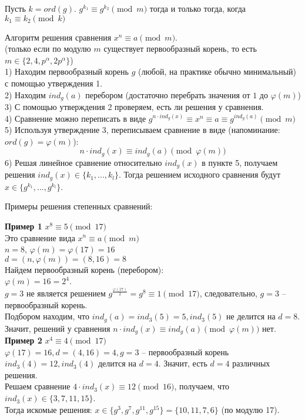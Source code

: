 \begin{proposition}[б/д]
    Пусть $k = ord(g)$. $g^{k_1} \equiv g^{k_2} \pmod{m}$ тогда и только тогда, когда $k_1 \equiv k_2 \pmod{k}$
\end{proposition}

\begin{example}
    Алгоритм решения сравнения $x^n \equiv a \pmod{m}$.\\
    (только если по модулю $m$ существует первообразный корень, то есть $m \in \{2, 4, p^{\alpha}, 2p^{\alpha}\}$)\\
    1) Находим первообразный корень $g$ (любой, на практике обычно минимальный) с помощью утверждения 1.\\
    2) Находим $ind_g(a)$ перебором (достаточно перебрать значения от $1$ до $\varphi(m)$)\\
    3) С помощью утверждения 2 проверяем, есть ли решения у сравнения.\\
    4) Сравнение можно переписать в виде $g^{n \cdot ind_g(x)} \equiv x^n \equiv a \equiv g^{ind_g(a)} \pmod{m}$\\
    5) Используя утверждение 3, переписываем сравнение в виде (напоминание: $ord(g) = \varphi(m)$):
    $$
        n \cdot ind_g(x) \equiv ind_g(a) \pmod{\varphi(m)}
    $$
    6) Решая линейное сравнение относительно $ind_g(x)$ в пункте 5, получаем решения $ind_g(x) \in \{k_1, ..., k_l\}$. Тогда решением исходного сравнения будут $x \in \{g^{k_1}, ..., g^{k_l}\}$.
\end{example}

Примеры решения степенных сравнений:

\textbf{Пример 1} $x^8 \equiv 5 \pmod {17}$\\
Это сравнение вида $x^n \equiv a \pmod {m}$\\
$n = 8$, $\varphi(m) = \varphi(17) = 16$\\
$d = (n, \varphi(m)) = (8, 16) = 8$\\
Найдем первообразный корень (перебором):\\
$\varphi(m) = 16 = 2^4$.\\
$g = 3$ не является решением $g^{\frac{\varphi(17)}{2}} = g^8 \equiv 1 \pmod{17}$, следовательно, $g = 3$ -- первообразный корень.\\
Подбором находим, что $ind_g(a) = ind_3(5) = 5, ind_3(5)$ не делится на $d = 8$. Значит, решений у сравнения $n \cdot ind_g(x) \equiv ind_g(a) \pmod{\varphi(m)}$ нет.\\

\textbf{Пример 2} $x ^ 4 \equiv 4 \pmod{17}$\\
$\varphi(17) = 16, d = (4, 16) = 4, g = 3$ -- первообразный корень\\
$ind_3(4) = 12, ind_3(4)$ делится на $d = 4$. Значит, есть $d = 4$ различных решения.\\
Решаем сравнение $4 \cdot ind_3(x) \equiv 12 \pmod{16}$, получаем, что $ind_3(x) \in \{3,7,11,15\}$.\\
Тогда искомые решения: $x \in \{g^{3}, g^{7}, g^{11}, g^{15}\} = \{10, 11, 7, 6\}$ (по модулю 17).\\



